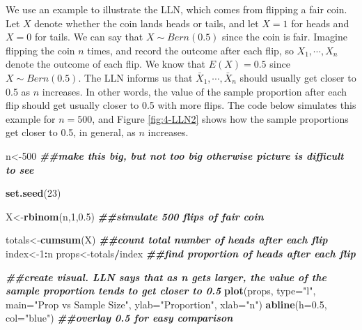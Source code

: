 \documentclass[
]{book}
\newenvironment{Shaded}{\begin{snugshade}}{\end{snugshade}}
\newcommand{\AttributeTok}[1]{\textcolor[rgb]{0.13,0.29,0.53}{#1}}
\newcommand{\DecValTok}[1]{\textcolor[rgb]{0.00,0.00,0.81}{#1}}
\newcommand{\DocumentationTok}[1]{\textcolor[rgb]{0.56,0.35,0.01}{\textbf{\textit{#1}}}}
\newcommand{\FloatTok}[1]{\textcolor[rgb]{0.00,0.00,0.81}{#1}}
\newcommand{\FunctionTok}[1]{\textcolor[rgb]{0.13,0.29,0.53}{\textbf{#1}}}
\newcommand{\NormalTok}[1]{#1}
\newcommand{\OtherTok}[1]{\textcolor[rgb]{0.56,0.35,0.01}{#1}}
\newcommand{\SpecialCharTok}[1]{\textcolor[rgb]{0.81,0.36,0.00}{\textbf{#1}}}
\newcommand{\StringTok}[1]{\textcolor[rgb]{0.31,0.60,0.02}{#1}}
\begin{document}
We use an example to illustrate the LLN, which comes from flipping a fair coin. Let \(X\) denote whether the coin lands heads or tails, and let \(X=1\) for heads and \(X=0\) for tails. We can say that \(X \sim Bern(0.5)\) since the coin is fair. Imagine flipping the coin \(n\) times, and record the outcome after each flip, so \(X_1, \cdots, X_n\) denote the outcome of each flip. We know that \(E(X) = 0.5\) since \(X \sim Bern(0.5)\). The LLN informs us that \(\bar{X}_1, \cdots, \bar{X}_n\) should usually get closer to 0.5 as \(n\) increases. In other words, the value of the sample proportion after each flip should get usually closer to 0.5 with more flips. The code below simulates this example for \(n=500\), and Figure \ref{fig:4-LLN2} shows how the sample proportions get closer to 0.5, in general, as \(n\) increases.

\begin{Shaded}
\begin{Highlighting}[]
\NormalTok{n}\OtherTok{\textless{}{-}}\DecValTok{500} \DocumentationTok{\#\#make this big, but not too big otherwise picture is difficult to see}

\FunctionTok{set.seed}\NormalTok{(}\DecValTok{23}\NormalTok{)}

\NormalTok{X}\OtherTok{\textless{}{-}}\FunctionTok{rbinom}\NormalTok{(n,}\DecValTok{1}\NormalTok{,}\FloatTok{0.5}\NormalTok{) }\DocumentationTok{\#\#simulate 500 flips of fair coin}

\NormalTok{totals}\OtherTok{\textless{}{-}}\FunctionTok{cumsum}\NormalTok{(X) }\DocumentationTok{\#\#count total number of heads after each flip}
\NormalTok{index}\OtherTok{\textless{}{-}}\DecValTok{1}\SpecialCharTok{:}\NormalTok{n}
\NormalTok{props}\OtherTok{\textless{}{-}}\NormalTok{totals}\SpecialCharTok{/}\NormalTok{index }\DocumentationTok{\#\#find proportion of heads after each flip}

\DocumentationTok{\#\#create visual. LLN says that as n gets larger, the value of the sample proportion tends to get closer to 0.5}
\FunctionTok{plot}\NormalTok{(props, }\AttributeTok{type=}\StringTok{"l"}\NormalTok{, }\AttributeTok{main=}\StringTok{"Prop vs Sample Size"}\NormalTok{, }\AttributeTok{ylab=}\StringTok{"Proportion"}\NormalTok{, }\AttributeTok{xlab=}\StringTok{"n"}\NormalTok{)}
\FunctionTok{abline}\NormalTok{(}\AttributeTok{h=}\FloatTok{0.5}\NormalTok{, }\AttributeTok{col=}\StringTok{"blue"}\NormalTok{) }\DocumentationTok{\#\#overlay 0.5 for easy comparison}
\end{Highlighting}
\end{Shaded}
\end{document}
